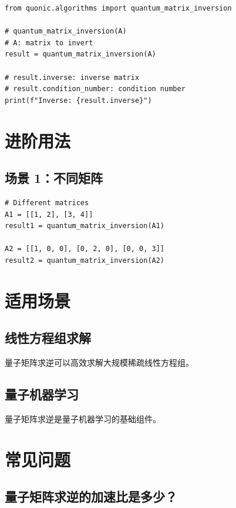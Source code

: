 \documentclass[12pt,a4paper]{article}
\begin{document}
\begin{lstlisting}[style=python]
from quonic.algorithms import quantum_matrix_inversion

# quantum_matrix_inversion(A)
# A: matrix to invert
result = quantum_matrix_inversion(A)

# result.inverse: inverse matrix
# result.condition_number: condition number
print(f"Inverse: {result.inverse}")
\end{lstlisting}

\section{进阶用法}

\subsection{场景 1：不同矩阵}

\begin{lstlisting}[style=python]
# Different matrices
A1 = [[1, 2], [3, 4]]
result1 = quantum_matrix_inversion(A1)

A2 = [[1, 0, 0], [0, 2, 0], [0, 0, 3]]
result2 = quantum_matrix_inversion(A2)
\end{lstlisting}

\section{适用场景}

\subsection{线性方程组求解}

量子矩阵求逆可以高效求解大规模稀疏线性方程组。

\subsection{量子机器学习}

量子矩阵求逆是量子机器学习的基础组件。

\section{常见问题}

\subsection{量子矩阵求逆的加速比是多少？}
\end{document}
